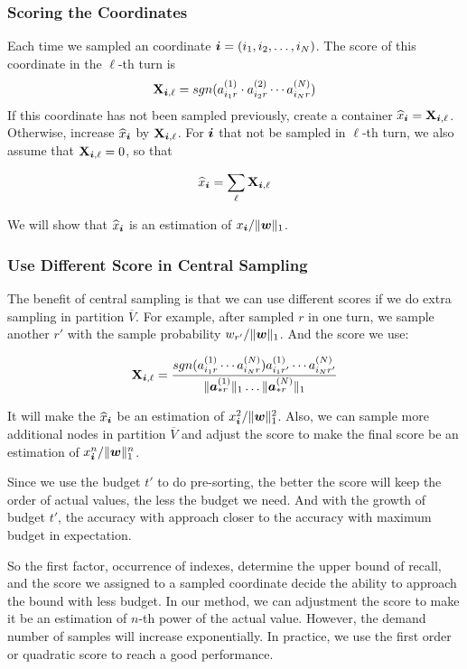 \documentclass[letterpaper]{article}
\newcommand{\Sca}[3]{{#1}^{(#2)}_{i_#2#3}}%
\newcommand{\V}[1]{{\bm{{\MakeLowercase{#1}}}}}
\newcommand{\Vacol}[1]{\V{a}^{(#1)}_{*r}}
\newcommand{\M}[1]{{\bm{\mathbf{\MakeUppercase{#1}}}}}
\newcommand{\norm}[2]{\|#1\|_{#2}}
\newcommand{\Coord}{(i_1,i_2,\ldots,i_N)}
\begin{document}
\subsubsection{Scoring the Coordinates}

Each time we sampled an coordinate $\V{i} = \Coord $. The score of this coordinate in the $\ell $-th turn is
\[
\M{X}_{\V{i},\ell}  = sgn(\Sca{a}{1}{r}\cdot\Sca{a}{2}{r}\cdots\Sca{a}{N}{r})
\]
If this coordinate has not been sampled previously, create a container $\widehat{x}_{\V{i}} = \M{X}_{\V{i},\ell}$. Otherwise, increase $\widehat{x}_{\V{i}}$ by $\M{X}_{\V{i},\ell}$. For $\V{i}$ that not be sampled in $\ell$-th turn, we also assume that $\M{X}_{\V{i},\ell}=0$, so that

\[
\widehat{x}_{\V{i}} = \sum_{\ell} \M{X}_{\V{i},\ell}
\]

We will show that $\widehat{x}_{\V{i}}$ is an estimation of $x_{\V{i}}/\norm{\V{w}}{1}$.

\subsubsection{Use Different Score in Central Sampling}
The benefit of central sampling is that we can use different scores if we do extra sampling in partition $\overline{V}$. For example, after sampled $r$ in one turn, we sample another $r'$ with the sample probability $w_{r'}/\norm{\V{w}}{1}$. And the score we use:

\[
\M{X}_{\V{i},\ell}  = \frac{sgn(\Sca{a}{1}{r}\cdots\Sca{a}{N}{r})\Sca{a}{1}{r'}\cdots\Sca{a}{N}{r'}}{\norm{\Vacol{1}}{1}\ldots\norm{\Vacol{N}}{1}}
\]

It will make the $\widehat{x}_{\V{i}}$ be an estimation of $x_{\V{i}}^2/\norm{\V{w}}{1}^2$. Also, we can sample more additional nodes in partition $\overline{V}$ and adjust the score to make the final score be an estimation of $x_{\V{i}}^n/\norm{\V{w}}{1}^n$.

Since we use the budget $t'$ to do pre-sorting, the better the score will keep the order of actual values, the less the budget we need. And with the growth of budget $t'$, the accuracy with approach closer to the accuracy with maximum budget in expectation.

So the first factor, occurrence of indexes, determine the upper bound of recall, and the score we assigned to a sampled coordinate decide the ability to approach the bound with less budget. In our method, we can adjustment the score to make it be an estimation of $n$-th power of the actual value. However, the demand number of samples will increase exponentially. In practice, we use the first order or quadratic score to reach a good performance.
\end{document}
